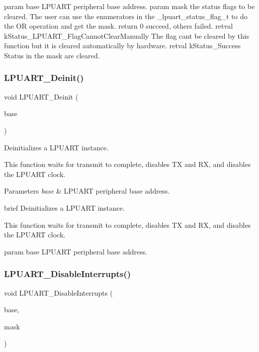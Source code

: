 param base L\+P\+U\+A\+RT peripheral base address. param mask the status flags to be cleared. The user can use the enumerators in the \+\_\+lpuart\+\_\+status\+\_\+flag\+\_\+t to do the OR operation and get the mask. return 0 succeed, others failed. retval k\+Status\+\_\+\+L\+P\+U\+A\+R\+T\+\_\+\+Flag\+Cannot\+Clear\+Manually The flag can\textquotesingle{}t be cleared by this function but it is cleared automatically by hardware. retval k\+Status\+\_\+\+Success Status in the mask are cleared. \mbox{\label{group__lpuart__driver_ga303ff3b77767bafa449d96f1e8c921e0}} 
\subsubsection{\texorpdfstring{LPUART\_Deinit()}{LPUART\_Deinit()}}
{\footnotesize\ttfamily void L\+P\+U\+A\+R\+T\+\_\+\+Deinit (\begin{DoxyParamCaption}\item[{\mbox{\hyperlink{struct_l_p_u_a_r_t___type}{L\+P\+U\+A\+R\+T\+\_\+\+Type}} $\ast$}]{base }\end{DoxyParamCaption})}



Deinitializes a L\+P\+U\+A\+RT instance. 

This function waits for transmit to complete, disables TX and RX, and disables the L\+P\+U\+A\+RT clock.


\begin{DoxyParams}{Parameters}
{\em base} & L\+P\+U\+A\+RT peripheral base address.\\
\hline
\end{DoxyParams}
brief Deinitializes a L\+P\+U\+A\+RT instance.

This function waits for transmit to complete, disables TX and RX, and disables the L\+P\+U\+A\+RT clock.

param base L\+P\+U\+A\+RT peripheral base address. \mbox{\label{group__lpuart__driver_ga2540406e4a338199acddaa828829cad8}} 
\subsubsection{\texorpdfstring{LPUART\_DisableInterrupts()}{LPUART\_DisableInterrupts()}}
{\footnotesize\ttfamily void L\+P\+U\+A\+R\+T\+\_\+\+Disable\+Interrupts (\begin{DoxyParamCaption}\item[{\mbox{\hyperlink{struct_l_p_u_a_r_t___type}{L\+P\+U\+A\+R\+T\+\_\+\+Type}} $\ast$}]{base,  }\item[{uint32\+\_\+t}]{mask }\end{DoxyParamCaption})}



